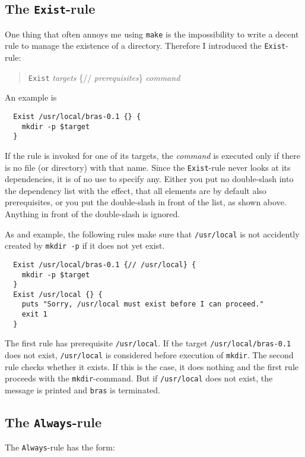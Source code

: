 \documentclass[12pt]{article}
\newcommand{\bras}{\texttt{bras}}
\newcommand{\make}{\texttt{make}}
\begin{document}
\subsection{The \texttt{Exist}-rule}

One thing that often annoys me using \make{} is the impossibility to
write a decent rule to manage the existence of a directory. Therefore
I introduced the \texttt{Exist}-rule:
\begin{quote}
  \texttt{Exist} \textit{targets} \{// \textit{prerequisites}\} \textit{command}
\end{quote}
An example is
\begin{verbatim}
  Exist /usr/local/bras-0.1 {} {
    mkdir -p $target
  }
\end{verbatim}
If the rule is invoked for one of its targets, the \textit{command} is
executed only if there is no file (or directory) with that name.
Since the \texttt{Exist}-rule never looks at its dependencies, it is
of no use to specify any. Either you put no double-slash into the
dependency list with the effect, that all elements are by default also
prerequisites, or you put the double-slash in front of the list, as
shown above. Anything in front of the double-slash is ignored.

As and example, the following rules make sure that
\texttt{/usr/local} is not accidently created by \texttt{mkdir -p} if
it does not yet exist.

\begin{verbatim}
  Exist /usr/local/bras-0.1 {// /usr/local} {
    mkdir -p $target
  }
  Exist /usr/local {} {
    puts "Sorry, /usr/local must exist before I can proceed."
    exit 1
  }     
\end{verbatim}
The first rule has prerequisite \texttt{/usr/local}. If the target
\texttt{/usr/local/bras-0.1}
does not exist, \texttt{/usr/local} is considered
before execution of \texttt{mkdir}. The second rule checks whether it
exists. If this is the case, it does nothing and the first rule
proceeds with the \texttt{mkdir}-command. But if
\texttt{/usr/local} does not exist, the message is printed and \bras{}
is terminated.

\subsection{The \texttt{Always}-rule}

The \texttt{Always}-rule has the form:
\end{document}
